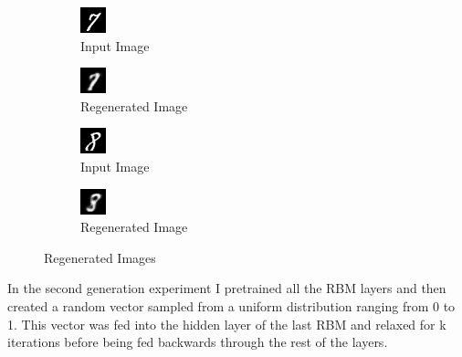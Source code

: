 \documentclass{article}
\begin{document}
	\begin{figure}[h]
		\centering
		\begin{subfigure}[b]{0.3\textwidth}
			\centering
			\includegraphics[scale=2.0]{images/in0}
			\caption{Input Image}
		\end{subfigure}
		\begin{subfigure}[b]{0.3\textwidth}
			\centering
			\includegraphics[scale=2.0]{images/gen0}
			\caption{Regenerated Image}
		\end{subfigure}
	
		\begin{subfigure}[b]{0.3\textwidth}
			\centering
			\includegraphics[scale=2.0]{images/in1}
			\caption{Input Image}
		\end{subfigure}
		\begin{subfigure}[b]{0.3\textwidth}
			\centering
			\includegraphics[scale=2.0]{images/gen1}
			\caption{Regenerated Image}
		\end{subfigure}
	
		\caption{Regenerated Images}
		\label{fig:regenerated}
	\end{figure}

	In the second generation experiment I pretrained all the RBM layers and then created a random vector sampled from a uniform distribution ranging from 0 to 1. This vector was fed into the hidden layer of the last RBM and relaxed for k iterations before being fed backwards through the rest of the layers.  
	
\end{document}

